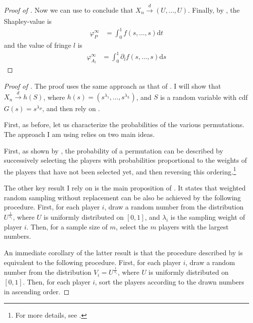 \documentclass[a4paper]{article}
\newcommand{\dt}{\mathrm{d}t}
\newcommand{\ds}{\mathrm{d}s}
\begin{document}
\begin{proof}[Proof of ]
    Now we can use  to conclude that $X_n \xrightarrow[]{d} (U, \dots, U)$.
    Finally, by , the Shapley-value is
    \begin{align*}
        \varphi_P^\infty & = \int_0^1 f(s, \dots, s) \dt
    \end{align*}
    and the value of fringe $l$ is
    \begin{align*}
        \varphi_{A_l}^\infty & = \int_0^1 \partial_l f(s, \dots, s) \ds
    \end{align*}

\end{proof}

\begin{proof}[Proof of ]
    The proof uses the same approach as that of .
    I will show that $X_n \xrightarrow[]{d} h(S)$, where $h(s) = (s^{\lambda_1}, \dots, s^{\lambda_L})$, and $S$ is a random variable with cdf $G(s) = s^{\lambda_P}$, and then rely on .

    First, as before, let us characterize the probabilities of the various permutations.
    The approach I am using relies on two main ideas.

    First, as shown by \textcite{kalai1987weighted}, the probability of a permutation can be described by successively selecting the players with probabilities proportional to the weights of the players that have not been selected yet, and then reversing this ordering.\footnote{
        For more details, see .
    }

    The other key result I rely on is the main proposition of \textcite{efraimidis2006weighted}.
    It states that weighted random sampling without replacement can be also be achieved by the following procedure.
    First, for each player $i$, draw a random number from the distribution $U^{\frac{1}{\lambda_i}}$, where $U$ is uniformly distributed on $[0, 1]$, and $\lambda_i$ is the sampling weight of player $i$.
    Then, for a sample size of $m$, select the $m$ players with the largest numbers.

    An immediate corollary of the latter result is that the procedure described by \textcite{kalai1987weighted} is equivalent to the following procedure.
    First, for each player $i$, draw a random number from the distribution $V_i = U^{\frac{1}{\lambda_i}}$, where $U$ is uniformly distributed on $[0, 1]$.
    Then, for each player $i$, sort the players according to the drawn numbers in ascending order.


\end{proof}
\end{document}
